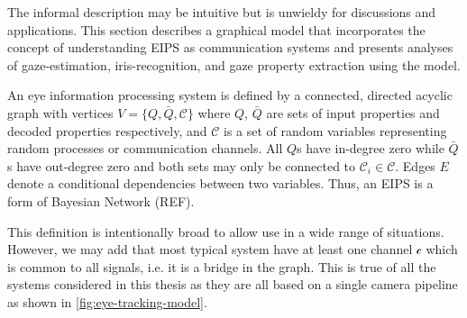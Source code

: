 The informal description may be intuitive but is unwieldy for discussions and applications. This section describes a graphical model that incorporates the concept of understanding EIPS as communication systems and presents analyses of gaze-estimation, iris-recognition, and gaze property extraction using the model.


An eye information processing system is defined by a connected, directed acyclic graph with vertices $V=\{Q, \bar{Q}, \mathcal{C}\}$ where $Q$, $\bar{Q}$ are sets of input properties and decoded properties respectively, and $\mathcal{C}$ is a set of random variables representing random processes or communication channels. All $Q$s have in-degree zero  while $\bar{Q}$s have out-degree zero and both sets may only be connected to $\mathcal{C}_i \in \mathcal{C}$. Edges $E$ denote a conditional dependencies between two variables. Thus, an EIPS is a form of Bayesian Network (REF).

This definition is intentionally broad to allow use in a wide range of situations. However, we may add that most typical system have at least one channel $\mathcal{c}$ which is common to all signals, i.e. it is a bridge in the graph. This is true of all the systems considered in this thesis as they are all based on a single camera pipeline as shown in \cref{fig:eye-tracking-model}.






